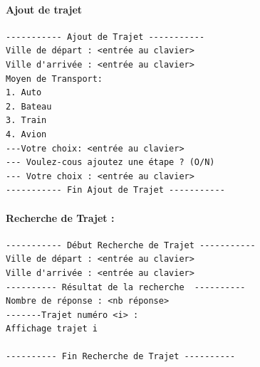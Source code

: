 \documentclass[10pt,a4paper,twoside]{article}
\begin{document}
\paragraph{Ajout de trajet}
\begin{verbatim}
----------- Ajout de Trajet -----------
Ville de départ : <entrée au clavier>
Ville d'arrivée : <entrée au clavier>
Moyen de Transport:
1. Auto
2. Bateau
3. Train
4. Avion
---Votre choix: <entrée au clavier>
--- Voulez-cous ajoutez une étape ? (O/N)
--- Votre choix : <entrée au clavier>
----------- Fin Ajout de Trajet -----------
\end{verbatim}

\paragraph{Recherche de Trajet :}
\begin{verbatim}
----------- Début Recherche de Trajet -----------
Ville de départ : <entrée au clavier>
Ville d'arrivée : <entrée au clavier>
---------- Résultat de la recherche  ----------
Nombre de réponse : <nb réponse>
-------Trajet numéro <i> :
Affichage trajet i

---------- Fin Recherche de Trajet ----------
\end{verbatim}


\newpage
\end{document}
